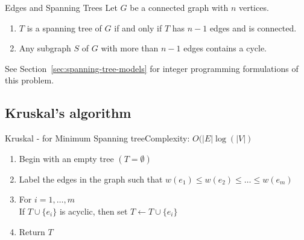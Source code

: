 \begin{lemma}{Edges and Spanning Trees}{}
Let  $G$ be a  connected graph with $n$ vertices.  
\begin{enumerate}
\item $T$ is a spanning tree of $G$ if and only if $T$ has $n-1$ edges and is connected.
\item Any subgraph $S$ of $G$ with more than $n-1$ edges contains a cycle.
\end{enumerate}
\end{lemma}


See Section~\ref{sec:spanning-tree-models} for integer programming formulations of this problem.  
\subsection{Kruskal's algorithm}
\begin{general}{Kruskal  - for Minimum Spanning tree}{Complexity: $O(|E| \log(|V|)$}
\label{alg:Kruskal}
\begin{enumerate}
\item Begin with an empty tree $(T = \emptyset)$
\item Label the edges in the graph such that $w(e_1) \leq w(e_2) \leq \dots \leq w(e_m)$
\item For $i=1, \dots, m$\\
\indent  If $T \cup\{e_i\}$ is acyclic, then set $T \leftarrow T \cup \{e_i\}$
\item Return $T$
\end{enumerate}
\end{general}




